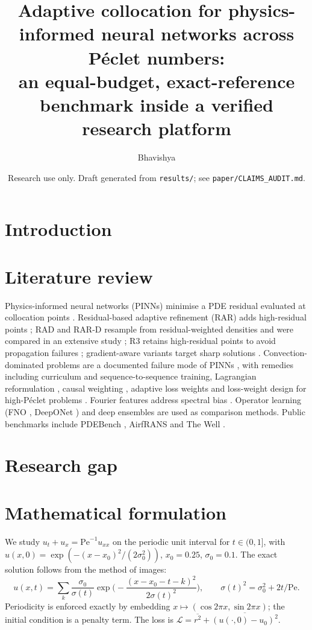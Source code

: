\documentclass[10pt]{article}
\title{Adaptive collocation for physics-informed neural networks across P\'eclet numbers:\\
an equal-budget, exact-reference benchmark inside a verified research platform}
\author{Bhavishya}
\date{Research use only. Draft generated from \texttt{results/}; see \texttt{paper/CLAIMS\_AUDIT.md}.}
\begin{document}
\maketitle

\begin{abstract}

\end{abstract}

\section{Introduction}


\section{Literature review}
Physics-informed neural networks (PINNs) minimise a PDE residual evaluated at collocation points
\citep{raissi2017pinn1}. Residual-based adaptive refinement (RAR) adds high-residual points
\citep{lu2021deepxde}; RAD and RAR-D resample from residual-weighted densities and were compared in an
extensive study \citep{wu2023sampling}; R3 retains high-residual points to avoid propagation failures
\citep{daw2022r3}; gradient-aware variants target sharp solutions \citep{zhang2023asm}. Convection-dominated
problems are a documented failure mode of PINNs \citep{krishnapriyan2021failure}, with remedies including
curriculum and sequence-to-sequence training, Lagrangian reformulation \citep{lpinn2022}, causal weighting
\citep{wang2022causal}, adaptive loss weights \citep{wang2021gradient} and loss-weight design for high-P\'eclet
problems \citep{lossweight2025}. Fourier features address spectral bias \citep{tancik2020fourier}. Operator
learning (FNO \citep{li2021fno}, DeepONet \citep{lu2021deeponet}) and deep ensembles
\citep{lakshminarayanan2017ensembles} are used as comparison methods. Public benchmarks include PDEBench
\citep{takamoto2022pdebench}, AirfRANS \citep{bonnet2022airfrans} and The Well \citep{ohana2024well}.

\section{Research gap}


\section{Mathematical formulation}
We study $u_t + u_x = \mathrm{Pe}^{-1}u_{xx}$ on the periodic unit interval for $t\in(0,1]$, with
$u(x,0)=\exp(-(x-x_0)^2/(2\sigma_0^2))$, $x_0=0.25$, $\sigma_0=0.1$. The exact solution follows from the
method of images:
\[ u(x,t)=\sum_{k}\frac{\sigma_0}{\sigma(t)}\exp\!\Big(-\frac{(x-x_0-t-k)^2}{2\sigma(t)^2}\Big),\qquad
\sigma(t)^2=\sigma_0^2+2t/\mathrm{Pe}. \]
Periodicity is enforced exactly by embedding $x\mapsto(\cos2\pi x,\sin2\pi x)$; the initial condition is
a penalty term. The loss is $\mathcal L=\overline{r^2}+\overline{(u(\cdot,0)-u_0)^2}$.
\end{document}
